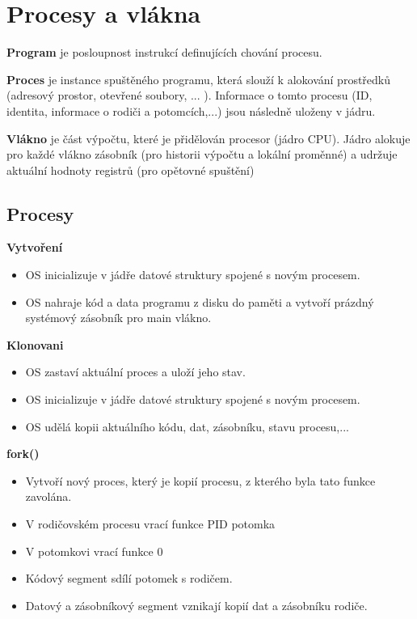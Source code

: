\documentclass{szzclass}
\author{Daniel Hampl}
\begin{document}

\tableofcontents
\newpage


\section{Procesy a vlákna}

\textbf{Program}
je posloupnost instrukcí definujících chování procesu.

\textbf{Proces}
je instance spuštěného programu, která
slouží k alokování prostředků (adresový prostor, otevřené soubory, ... ).
Informace o tomto procesu (ID, identita, informace o rodiči a potomcích,...) jsou následně uloženy v jádru.

\textbf{Vlákno}
je část výpočtu, které je přidělován procesor (jádro CPU).
Jádro alokuje pro každé vlákno zásobník (pro historii výpočtu a lokální proměnné) a udržuje aktuální hodnoty registrů (pro opětovné spuštění)

\subsection{Procesy}
\textbf{Vytvoření}
\begin{itemize}
    \item OS inicializuje v jádře datové struktury spojené s novým procesem.
    \item OS nahraje kód a data programu z disku do paměti a vytvoří prázdný systémový zásobník pro main vlákno.
\end{itemize}

\textbf{Klonovani}
\begin{itemize}
    \item OS zastaví aktuální proces a uloží jeho stav.
    \item OS inicializuje v jádře datové struktury spojené s novým procesem.
    \item OS udělá kopii aktuálního kódu, dat, zásobníku, stavu procesu,...
\end{itemize}

\textbf{fork()}
\begin{itemize}
    \item Vytvoří nový proces, který je kopií procesu, z kterého byla tato funkce zavolána.
    \item V rodičovském procesu vrací funkce PID potomka
    \item V potomkovi vrací funkce 0
    \item Kódový segment sdílí potomek s rodičem.
    \item Datový a zásobníkový segment vznikají kopií dat a zásobníku rodiče.
\end{itemize}
\end{document}
